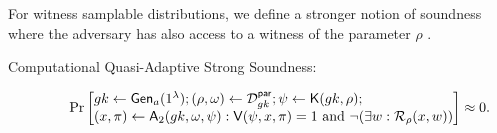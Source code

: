 For witness samplable distributions, we define a stronger notion of soundness where the adversary has also access to a witness of the parameter $\rho$ \cite{EPRINT:GonHevRaf15}.
\begin{description}
\item[Computational Quasi-Adaptive Strong Soundness:]
$$\Pr\begin{bmatrix*}[l]
    \gk \gets \G_a(1^\lambda);
    (\rho,\omega) \gets \dist_\gk^\mathsf{par};
    \psi \gets \algK(\gk, \rho); \\
    (x, \pi) \gets \advA_2(\gk, \omega,\psi) :
        \algV(\psi, x, \pi) = 1 \text{ and } \neg (\exists w : \R_\rho(x, w))
\end{bmatrix*} \approx 0.$$ 

\end{description}
